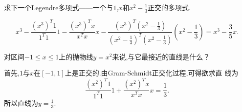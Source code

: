 ﻿\documentclass{book} \usepackage{exsheets} \usepackage{xeCJK}
\begin{document}
\begin{question}
  求下一个Legendre多项式——一个与$1$,$x$和$x^2-\frac{1}{3}$正交的多项式.
\end{question}
\begin{solution}
$$
x^3-\frac{(x^3)^T1}{1^T1}1-\frac{(x^3)^Tx}{x^Tx}x-\frac{(x^3)^T(x^2-\frac{1}{3})}{(x^2-\frac{1}{3})^T(x^2-\frac{1}{3})}(x^2-\frac{1}{3})=x^3-\frac{3}{5}x.
$$
\end{solution}
\begin{question}
 对区间$-1\leq x\leq 1$上的抛物线$y=x^2$来说,与它最接近的直线是什么？
\end{question}
\begin{solution}
 首先,$1$与$x$在$[-1,1]$上是正交的.由Gram-Schmidt正交化过程,可得欲求直
 线为
$$
\frac{(x^2)^T1}{1^T1}1+\frac{(x^2)^Tx}{x^Tx}x=\frac{1}{3}.
$$
所以直线为$y=\frac{1}{3}$.
\end{solution}
\end{document}
